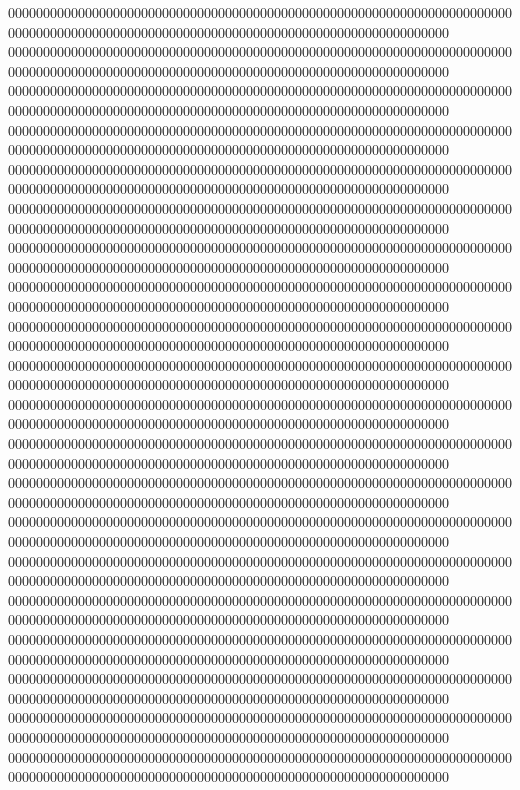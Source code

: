 000000000000000000000000000000000000000000000000000000000000000000000000000000000000000000000000000000000000000000000000000000000000000
000000000000000000000000000000000000000000000000000000000000000000000000000000000000000000000000000000000000000000000000000000000000000
000000000000000000000000000000000000000000000000000000000000000000000000000000000000000000000000000000000000000000000000000000000000000
000000000000000000000000000000000000000000000000000000000000000000000000000000000000000000000000000000000000000000000000000000000000000
000000000000000000000000000000000000000000000000000000000000000000000000000000000000000000000000000000000000000000000000000000000000000
000000000000000000000000000000000000000000000000000000000000000000000000000000000000000000000000000000000000000000000000000000000000000
000000000000000000000000000000000000000000000000000000000000000000000000000000000000000000000000000000000000000000000000000000000000000
000000000000000000000000000000000000000000000000000000000000000000000000000000000000000000000000000000000000000000000000000000000000000
000000000000000000000000000000000000000000000000000000000000000000000000000000000000000000000000000000000000000000000000000000000000000
000000000000000000000000000000000000000000000000000000000000000000000000000000000000000000000000000000000000000000000000000000000000000
000000000000000000000000000000000000000000000000000000000000000000000000000000000000000000000000000000000000000000000000000000000000000
000000000000000000000000000000000000000000000000000000000000000000000000000000000000000000000000000000000000000000000000000000000000000
000000000000000000000000000000000000000000000000000000000000000000000000000000000000000000000000000000000000000000000000000000000000000
000000000000000000000000000000000000000000000000000000000000000000000000000000000000000000000000000000000000000000000000000000000000000
000000000000000000000000000000000000000000000000000000000000000000000000000000000000000000000000000000000000000000000000000000000000000
000000000000000000000000000000000000000000000000000000000000000000000000000000000000000000000000000000000000000000000000000000000000000
000000000000000000000000000000000000000000000000000000000000000000000000000000000000000000000000000000000000000000000000000000000000000
000000000000000000000000000000000000000000000000000000000000000000000000000000000000000000000000000000000000000000000000000000000000000
000000000000000000000000000000000000000000000000000000000000000000000000000000000000000000000000000000000000000000000000000000000000000
000000000000000000000000000000000000000000000000000000000000000000000000000000000000000000000000000000000000000000000000000000000000000
